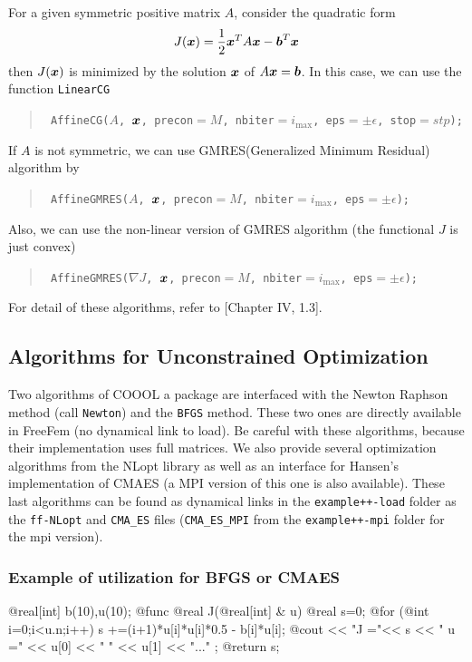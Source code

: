 \documentclass[a4paper,twoside,12pt]{book}
\def\vec#1{\mbox{\boldmath $#1$}}
\def\n{\nabla}
\begin{document}
For a given symmetric positive matrix $A$, consider the quadratic form
\[
J(\vec{x})=\frac{1}{2}\vec{x}^TA\vec{x}-\vec{b}^T\vec{x}
\]
then $J(\vec{x})$ is minimized by the solution $\vec{x}$ of $A\vec{x}=\vec{b}$.
In this case, we can use the function \texttt{LinearCG}
\begin{quote}\texttt{
AffineCG($A$, $\vec{x}$, precon$=M$, nbiter$=i_{\max}$, eps$=\pm\epsilon$, stop$=stp$);
}
\end{quote}
If $A$ is not symmetric, we can use GMRES(Generalized Minimum Residual) algorithm by
\begin{quote}\texttt{
AffineGMRES($A$, $\vec{x}$, precon$=M$, nbiter$=i_{\max}$, eps$=\pm\epsilon$);
}
\end{quote}
Also, we can use the non-linear version of GMRES algorithm
(the functional $J$ is just convex)
\begin{quote}\texttt{
AffineGMRES($\nabla J$, $\vec{x}$, precon$=M$, nbiter$=i_{\max}$, eps$=\pm\epsilon$);
}
\end{quote}
For detail of these algorithms, refer to \cite{Lucquin}[Chapter IV, 1.3].

\subsection{Algorithms for Unconstrained Optimization}
Two algorithms of
COOOL  a package \cite{coool} are interfaced with
the Newton Raphson method  (call \texttt{Newton}) and
the  \texttt{BFGS} method. 
These two ones are directly available in FreeFem (no dynamical link to load).
Be careful with these algorithms, because their
implementation uses full matrices. We also provide several
optimization algorithms from the NLopt library  \cite{nlopt} as well 
as an interface for Hansen's  implementation of CMAES 
(a MPI version of this one is also available). These last algorithms can
be found as dynamical links in the \texttt{example++-load} folder
as the \texttt{ff-NLopt} and \texttt{CMA\_ES} files (\texttt{CMA\_ES\_MPI}
from the \texttt{example++-mpi} folder for the mpi version).

\subsubsection{Example of utilization for BFGS or CMAES}
\bFF
  @real[int] b(10),u(10);
  @func @real J(@real[int] & u)
    {
      @real s=0;
      @for (@int i=0;i<u.n;i++)
          s +=(i+1)*u[i]*u[i]*0.5 - b[i]*u[i];
      @cout << "J ="<< s << " u =" <<  u[0] << " " << u[1] << "...\n" ;
      @return s;
    }
\end{document}
